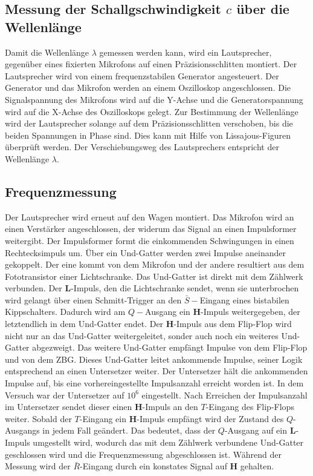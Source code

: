 \documentclass[parskip=half]{scrartcl}
\begin{document}
\subsection{Messung der Schallgschwindigkeit $c$ über die Wellenlänge}
Damit die Wellenlänge $\lambda$ gemessen werden kann, wird ein Lautsprecher, gegenüber eines fixierten Mikrofons auf einen Präzisionsschlitten montiert. Der Lautsprecher wird von einem frequenzstabilen Generator angesteuert. Der Generator und das Mikrofon werden an einem Oszilloskop angeschlossen. Die Signalspannung des Mikrofons wird auf die Y-Achse und die Generatorspannung wird auf die X-Achse des Oszilloskops gelegt. Zur Bestimmung der Wellenlänge wird der Lautsprecher solange auf dem Präzisionsschlitten verschoben, bis die beiden Spannungen in Phase sind. Dies kann mit Hilfe von Lissajous-Figuren überprüft werden. Der Verschiebungsweg des Lautsprechers entspricht der Wellenlänge $\lambda$.
\subsection{Frequenzmessung}
Der Lautsprecher wird erneut auf den Wagen montiert. Das Mikrofon wird an einen Verstärker angeschlossen, der widerum das Signal an einen Impulsformer weitergibt. Der Impulsformer formt die einkommenden Schwingungen in einen Rechtecksimpuls um. Über ein Und-Gatter werden zwei Impulse aneinander gekoppelt. Der eine kommt von dem Mikrofon und der andere resultiert aus dem Fototransistor einer Lichtschranke. Das Und-Gatter ist direkt mit dem Zählwerk verbunden. Der \textbf{L}-Impuls, den die Lichtschranke sendet, wenn sie unterbrochen wird gelangt über einen Schmitt-Trigger an den $\bar{S}-$Eingang eines bistabilen Kippschalters. Dadurch wird am $Q-$Ausgang ein \textbf{H}-Impuls weitergegeben, der letztendlich in dem Und-Gatter endet. Der \textbf{H}-Impuls aus dem Flip-Flop wird nicht nur an das Und-Gatter weitergeleitet, sonder auch noch ein weiteres Und-Gatter abgezweigt. Das weitere Und-Gatter empfängt Impulse von dem Flip-Flop und von dem ZBG. Dieses Und-Gatter leitet ankommende Impulse, seiner Logik entsprechend an einen Untersetzer weiter. Der Untersetzer hält die ankommenden Impulse auf, bis eine vorhereingestellte Impulsanzahl erreicht worden ist. In dem Versuch war der Untersetzer auf $10^6$ eingestellt. Nach Erreichen der Impulsanzahl im Untersetzer sendet dieser einen \textbf{H}-Impuls an den $T$-Eingang des Flip-Flops weiter. Sobald der $T$-Eingang ein \textbf{H}-Impuls empfängt wird der Zustand des $Q$-Ausgangs in jedem Fall geändert. Das bedeutet, dass der $Q$-Ausgang auf ein \textbf{L}-Impuls umgestellt wird, wodurch das mit dem Zählwerk verbundene Und-Gatter geschlossen wird und die Frequenzmessung abgeschlossen ist. Während der Messung wird der $\bar{R}$-Eingang durch ein konstates Signal auf \textbf{H} gehalten.
\end{document}
